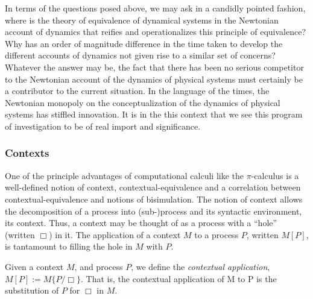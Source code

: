 In terms of the questions posed above, we may ask in a candidly
pointed fashion, where is the theory of equivalence of dynamical
systems in the Newtonian account of dynamics that reifies and
operationalizes this principle of equivalence? Why has an order of
magnitude difference in the time taken to develop the different
accounts of dynamics not given rise to a similar set of concerns?
Whatever the answer may be, the fact that there has been no serious
competitor to the Newtonian account of the dynamics of physical
systems must certainly be a contributor to the current situation. In
the language of the times, the Newtonian monopoly on the
conceptualization of the dynamics of physical systems has stiffled
innovation. It is in the this context that we see this program of
investigation to be of real import and significance.

\subsubsection{Contexts}

One of the principle advantages of computational calculi like the
$\pi$-calculus is a well-defined notion of context,
contextual-equivalence and a correlation between
contextual-equivalence and notions of bisimulation. The notion of
context allows the decomposition of a process into (sub-)process and
its syntactic environment, its context. Thus, a context may be
thought of as a process with a ``hole'' (written $\Box$) in it. The
application of a context $M$ to a process $P$, written $M[P]$, is
tantamount to filling the hole in $M$ with $P$. 


\begin{definition} Given a context $M$, and
  process $P$, we define the \emph{contextual application}, $M[P] :=
  M\{P/\Box\}$. That is, the contextual application of M to P is the
  substitution of $P$ for $\Box$ in $M$.
\end{definition}


